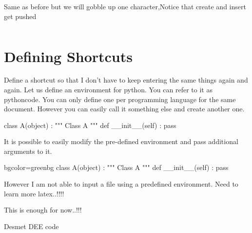 \documentclass{article}
\begin{document}
\begin{listing}[H]
\caption{Same as before but we will gobble up one character,Notice that create and insert get pushed}
\label{list:list2}
\inputminted[linenos=true,frame=single,firstline=9,lastline=25,showtabs=true,showspaces=true,tabsize=4,firstnumber=9,numberblanklines=false,stepnumber=2,gobble=1]{python}{sql.py}
\end{listing}



\pagebreak

\section{Defining Shortcuts}

Define a shortcut so that I don't have to keep entering the same things again and again. Let us define an environment for python. You can refer to it as pythoncode. You can only define one per programming language for the same document. 
However you can easily call it something else and create another one.




\begin{pythoncode}
class A(object) : 
	""" Class A """
	def __init__(self) : 
		pass
\end{pythoncode}

It is possible to easily modify the pre-defined environment and pass additional arguments to it. 

\begin{pythoncode*}{bgcolor=greenbg}
class A(object) : 
	""" Class A """
	def __init__(self) : 
		pass
\end{pythoncode*}

However I am not able to input a file using a predefined environment. Need to learn more latex..!!!! 

\Large{This is enough for now..!!!}

\begin{listing}[H]
\caption{Desmet DEE code}
\inputminted[linenos=true,frame=single,tabsize=4,bgcolor=greenbg,firstline=63,lastline=93,gobble=1,mathescape=true]{python}{DEE.py}
\end{listing}
\end{document}
